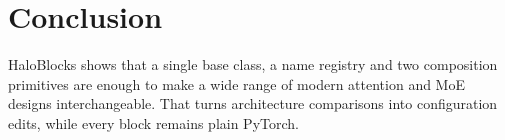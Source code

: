 \documentclass[11pt]{article}
\begin{document}
\section{Conclusion}

HaloBlocks shows that a single base class, a name registry and two composition primitives
are enough to make a wide range of modern attention and MoE designs interchangeable. That
turns architecture comparisons into configuration edits, while every block remains plain
PyTorch.



\end{document}
